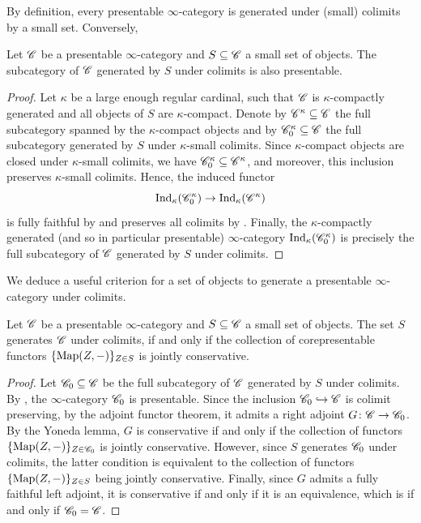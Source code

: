 \documentclass[english]{article}
\begin{document}
By definition, every presentable $\infty$-category is generated under (small) colimits by a small set. Conversely, 
\begin{prop}\label{Gen_Presentable}
    Let $\mathscr{C}$ be a presentable $\infty$-category and $S\subseteq \mathscr{C}$ a small set of objects. The subcategory of $\mathscr{C}$ generated by $S$ under colimits is also presentable. 
\end{prop}
\begin{proof}
    Let $\kappa$ be a large enough regular cardinal, such that $\mathscr{C}$ is $\kappa$-compactly generated and all objects of $S$ are $\kappa$-compact. Denote by $\mathscr{C}^\kappa \subseteq \mathscr{C}$ the full subcategory spanned by the $\kappa$-compact objects and by $\mathscr{C}_0^\kappa\subseteq \mathscr{C}$ the full subcategory generated by $S$ under $\kappa$-small colimits. Since $\kappa$-compact objects are closed under $\kappa$-small colimits, we have $\mathscr{C}_0^\kappa \subseteq \mathscr{C}^\kappa$, and moreover, this inclusion preserves $\kappa$-small colimits. Hence, the induced functor
    \[
        \operatorname{Ind}_\kappa(\mathscr{C}_0^\kappa) \to \operatorname{Ind}_\kappa(\mathscr{C}^\kappa)
    \]
    is fully faithful by \cite[Proposition 5.3.5.11]{htt} and preserves all colimits by \cite[Proposition 5.3.5.13]{htt}. Finally, the $\kappa$-compactly generated (and so in particular presentable) $\infty$-category $\operatorname{Ind}_\kappa(\mathscr{C}_0^\kappa)$ is precisely the full subcategory of $\mathscr{C}$ generated by $S$ under colimits.
\end{proof}

We deduce a useful criterion for a set of objects to generate a presentable $\infty$-category under colimits. 
\begin{cor}\label{Gen_Crit}
    Let $\mathscr{C}$ be a presentable $\infty$-category and $S\subseteq\mathscr{C}$ a small set of objects. The set $S$  generates $\mathscr{C}$ under colimits, if and only if the collection of corepresentable functors $\{\operatorname{Map}(Z,-)\}_{Z\in S}$ is jointly conservative.    
\end{cor}
\begin{proof}
    Let $\mathscr{C}_0 \subseteq \mathscr{C}$ be the full subcategory of $\mathscr{C}$ generated by $S$ under colimits. By , the $\infty$-category $\mathscr{C}_0$ is presentable. Since the inclusion $\mathscr{C}_0 \hookrightarrow \mathscr{C}$ is colimit preserving, by the adjoint functor theorem, it admits a right adjoint $G\colon \mathscr{C} \to \mathscr{C}_0$. By the Yoneda lemma, $G$ is conservative if and only if the collection of functors $\{\operatorname{Map}(Z,-)\}_{Z\in\mathscr{C}_0}$ is jointly conservative. However, since $S$ generates $\mathscr{C}_0$ under colimits, the latter condition is equivalent to the collection of functors $\{\operatorname{Map}(Z,-)\}_{Z\in S}$ being jointly conservative. Finally, since $G$ admits a fully faithful left adjoint, it is conservative if and only if it is an equivalence, which is if and only if $\mathscr{C}_0 = \mathscr{C}$.
\end{proof}
\end{document}
